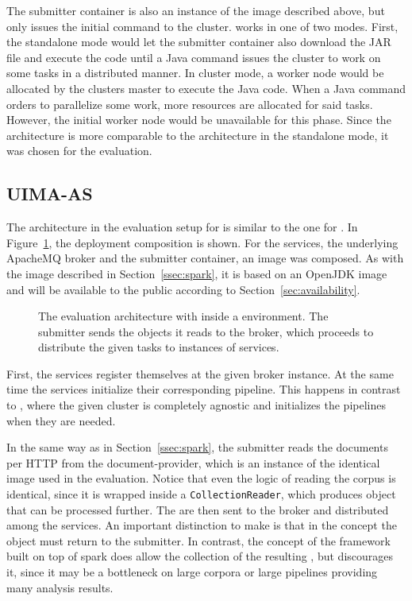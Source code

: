 The submitter container is also an instance of the \spark{} image described above, but only issues the initial command to the cluster. \spark{} works in one of two modes. First, the standalone mode would let the submitter container also download the JAR file and execute the code until a Java command issues the cluster to work on some tasks in a distributed manner. In cluster mode, a worker node would be allocated by the clusters master to execute the Java code. When a Java command orders \spark{} to parallelize some work, more resources are allocated for said tasks. However, the initial worker node would be unavailable for this phase. Since the architecture is more comparable to the \uimaas{} architecture in the standalone mode, it was chosen for the evaluation.
\subsection{UIMA-AS}
The \docker{} architecture in the evaluation setup for \uimaas{} is similar to the one for \spark{}. In Figure~\ref{fig:arch-uimaas}, the deployment composition is shown. For the \uimaas{} services, the underlying ApacheMQ broker and the submitter container, an \uimaas{} \docker{} image was composed. As with the \spark{} image described in Section~\ref{ssec:spark}, it is based on an OpenJDK image and will be available to the public according to Section~\ref{sec:availability}.
\begin{figure}[htb]
	\centering
	
	\caption[The evaluation architecture with UIMA-AS inside a Docker environment.]{The evaluation architecture with \uimaas{} inside a \docker{} environment. The submitter sends the \cas{} objects it reads to the broker, which proceeds to distribute the given tasks to instances of \uimaas{} services.}
	\label{fig:arch-uimaas}
\end{figure}
First, the \uimaas{} services register themselves at the given broker instance. At the same time the services initialize their corresponding pipeline. This happens in contrast to \spark{}, where the given cluster is completely \uima{} agnostic and initializes the pipelines when they are needed.

In the same way as in Section~\ref{ssec:spark}, the submitter reads the documents per HTTP from the document-provider, which is an instance of the identical image used in the \spark{} evaluation. Notice that even the logic of reading the corpus is identical, since it is wrapped inside a \lstinline|CollectionReader|, which produces \cas{} object that can be processed further. The \cas{} are then sent to the broker and distributed among the services. An important distinction to make is that in the \uimaas{} concept the \cas{} object must return to the submitter. In contrast, the concept of the framework built on top of spark does allow the collection of the resulting \cas{}, but discourages it, since it may be a bottleneck on large corpora or large pipelines providing many analysis results.

